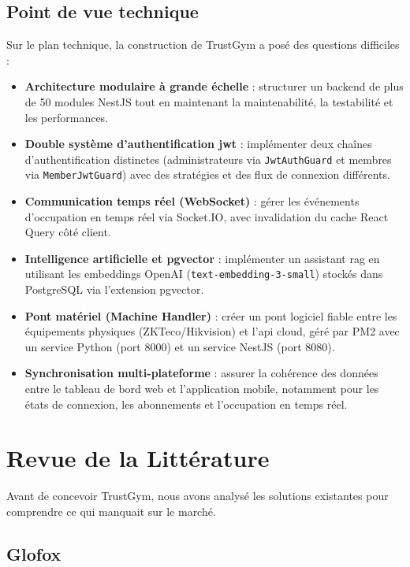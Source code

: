 \documentclass[../main.tex]{subfiles}
\begin{document}
\subsection{Point de vue technique}
Sur le plan technique, la construction de TrustGym a pos\'{e} des questions difficiles :

\begin{itemize}
  \item \textbf{Architecture modulaire \`{a} grande \'{e}chelle} : structurer un backend de plus de 50 modules NestJS tout en maintenant la maintenabilit\'{e}, la testabilit\'{e} et les performances.
  \item \textbf{Double syst\`{e}me d'authentification \acrshort{jwt}} : impl\'{e}menter deux cha\^{i}nes d'authentification distinctes (administrateurs via \texttt{JwtAuthGuard} et membres via \texttt{MemberJwtGuard}) avec des strat\'{e}gies et des flux de connexion diff\'{e}rents.
  \item \textbf{Communication temps r\'{e}el (WebSocket)} : g\'{e}rer les \'{e}v\'{e}nements d'occupation en temps r\'{e}el via Socket.IO, avec invalidation du cache React Query c\^{o}t\'{e} client.
  \item \textbf{Intelligence artificielle et pgvector} : impl\'{e}menter un assistant \acrshort{rag} en utilisant les embeddings OpenAI (\texttt{text-embedding-3-small}) stock\'{e}s dans PostgreSQL via l'extension pgvector.
  \item \textbf{Pont mat\'{e}riel (Machine Handler)} : cr\'{e}er un pont logiciel fiable entre les \'{e}quipements physiques (ZKTeco/Hikvision) et l'\acrshort{api} cloud, g\'{e}r\'{e} par PM2 avec un service Python (port 8000) et un service NestJS (port 8080).
  \item \textbf{Synchronisation multi-plateforme} : assurer la coh\'{e}rence des donn\'{e}es entre le tableau de bord web et l'application mobile, notamment pour les \'{e}tats de connexion, les abonnements et l'occupation en temps r\'{e}el.
\end{itemize}

\section{Revue de la Litt\'{e}rature}
Avant de concevoir TrustGym, nous avons analys\'{e} les solutions existantes pour comprendre ce qui manquait sur le march\'{e}.

\subsection{Glofox}
\end{document}
